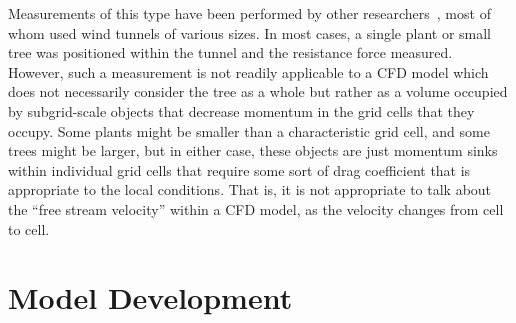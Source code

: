 \documentclass[12pt]{article}
\begin{document}
Measurements of this type have been performed by other researchers~\cite{Cao2012,Jalonen2014,Mayhead1973,Gillies2002,Ishikawa2006}, most of whom used wind tunnels of various sizes. In most cases, a single plant or small tree was positioned within the tunnel and the resistance force measured. However, such a measurement is not readily applicable to a CFD model which does not necessarily consider the tree as a whole but rather as a volume occupied by subgrid-scale objects that decrease momentum in the grid cells that they occupy. Some plants might be smaller than a characteristic grid cell, and some trees might be larger, but in either case, these objects are just momentum sinks within individual grid cells that require some sort of drag coefficient that is appropriate to the local conditions. That is, it is not appropriate to talk about the ``free stream velocity'' within a CFD model, as the velocity changes from cell to cell.


\section{Model Development}
\label{ssec:headingscap}
\end{document}
